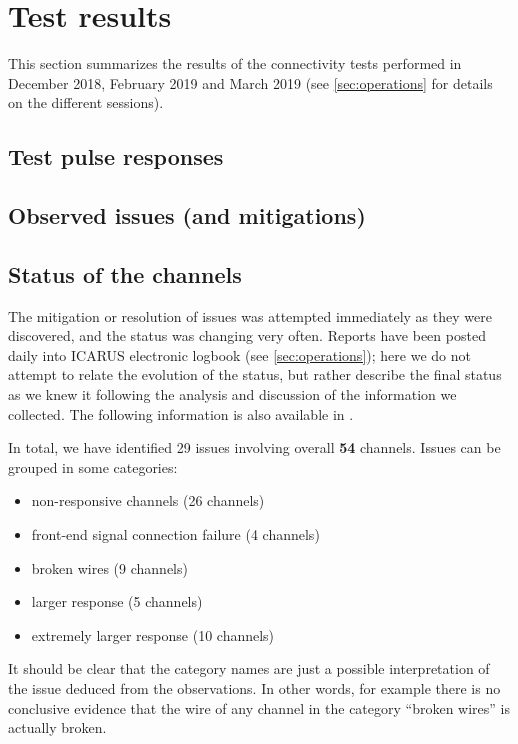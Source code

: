 \section{Test results}
\label{sec:results}


This section summarizes the results of the connectivity tests performed in
December 2018, February 2019 and March 2019 (see \cref{sec:operations} for
details on the different sessions).


\subsection{Test pulse responses}
\label{ssec:responses}




\subsection{Observed issues (and mitigations)}
\label{ssec:}



\subsection{Status of the channels}
\label{ssec:status}

The mitigation or resolution of issues was attempted immediately as they were
discovered, and the status was changing very often.
Reports have been posted daily into ICARUS electronic logbook\cite{ICARUSeLog}
(see \cref{sec:operations}); here we do not attempt to relate the evolution of
the status, but rather describe the final status as we knew it following the
analysis and discussion of the information we collected.
The following information is also available in \cite{SBNdocDB11703}.

In total, we have identified 29 issues involving overall \textbf{54} channels.
Issues can be grouped in some categories:
\begin{itemize}
  \item non-responsive channels (26 channels)
  \item front-end signal connection failure (4 channels)
  \item broken wires (9 channels)
  \item larger response (5 channels)
  \item extremely larger response (10 channels)
\end{itemize}
It should be clear that the category names are just a possible interpretation of
the issue deduced from the observations. In other words, for example there is
no conclusive evidence that the wire of any channel in the category ``broken
wires'' is actually broken.


